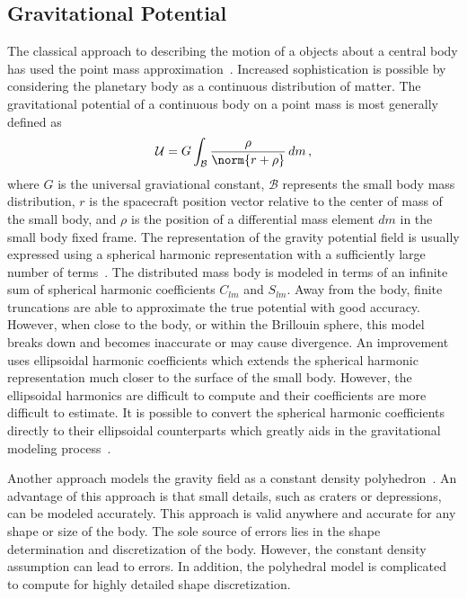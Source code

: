 \documentclass[11pt]{article} %
\begin{document}
\subsection{Gravitational Potential}
The classical approach to describing the motion of a objects about a central body has used the point mass approximation~\cite{vallado2001,bate1971}.
Increased sophistication is possible by considering the planetary body as a continuous distribution of matter. 
The gravitational potential of a continuous body on a point mass is most generally defined as 
\begin{equation*}
	\mathcal{U} = G \int_\mathcal{B} \frac{\rho}{\norm{r + \rho}} \, dm \, ,
\end{equation*}
where \( G \) is the universal graviational constant, \( \mathcal{B} \) represents the small body mass distribution, \( r \) is the spacecraft position vector relative to the center of mass of the small body, and \( \rho \) is the position of a differential mass element \( dm \) in the small body fixed frame.
The representation of the gravity potential field is usually expressed using a spherical harmonic representation with a sufficiently large number of terms~\cite{scheeres2012}.
The distributed mass body is modeled in terms of an infinite sum of spherical harmonic coefficients \( C_{lm} \) and \( S_{lm} \).
Away from the body, finite truncations are able to approximate the true potential with good accuracy.
However, when close to the body, or within the Brillouin sphere, this model breaks down and becomes inaccurate or may cause divergence. 
An improvement uses ellipsoidal harmonic coefficients which extends the spherical harmonic representation much closer to the surface of the small body.
However, the ellipsoidal harmonics are difficult to compute and their coefficients are more difficult to estimate.
It is possible to convert the spherical harmonic coefficients directly to their ellipsoidal counterparts which greatly aids in the gravitational modeling process~\cite{dechambre2002}.

Another approach models the gravity field as a constant density polyhedron~\cite{werner1996}.
An advantage of this approach is that small details, such as craters or depressions, can be modeled accurately.
This approach is valid anywhere and accurate for any shape or size of the body. 
The sole source of errors lies in the shape determination and discretization of the body.
However, the constant density assumption can lead to errors. 
In addition, the polyhedral model is complicated to compute for highly detailed shape discretization.
\end{document}
